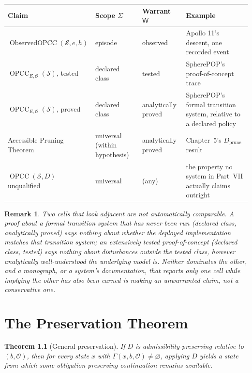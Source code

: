 \documentclass[11pt]{report}
\newtheorem{theorem}[definition]{Theorem}
\newtheorem{remark}[definition]{Remark}
\begin{document}
\begin{table}[h]
\centering
\renewcommand{\arraystretch}{1.3}
\begin{tabular}{p{3.4cm}p{2.6cm}p{2.8cm}p{4.6cm}}
\toprule
Claim & Scope $\Sigma$ & Warrant $\mathsf W$ & Example \\
\midrule
$\operatorname{ObservedOPCC}(\mathcal S, e, h)$ & episode & observed & Apollo 11's descent, one recorded event \\
$\operatorname{OPCC}_{E,\mathcal O}(\mathcal S)$, tested & declared class & tested & SpherePOP's proof-of-concept trace \\
$\operatorname{OPCC}_{E,\mathcal O}(\mathcal S)$, proved & declared class & analytically proved & SpherePOP's formal transition system, relative to a declared policy \\
Accessible Pruning Theorem & universal (within hypothesis) & analytically proved & Chapter~5's $D_{\mathrm{prune}}$ result \\
$\operatorname{OPCC}(\mathcal S, D)$ unqualified & universal & (any) & the property no system in Part~VII actually claims outright \\
\bottomrule
\end{tabular}
\end{table}

\begin{remark}
Two cells that look adjacent are not automatically comparable. A proof about a formal transition system that has never been run (declared class, analytically proved) says nothing about whether the deployed implementation matches that transition system; an extensively tested proof-of-concept (declared class, tested) says nothing about disturbances outside the tested class, however analytically well-understood the underlying model is. Neither dominates the other, and a monograph, or a system's documentation, that reports only one cell while implying the other has also been earned is making an unwarranted claim, not a conservative one.
\end{remark}


\chapter{The Preservation Theorem}

\begin{theorem}[General preservation]
If $D$ is admissibility-preserving relative to $(b, \mathcal O)$, then for every state $x$ with $\Gamma(x, b, \mathcal O) \ne \varnothing$, applying $D$ yields a state from which some obligation-preserving continuation remains available.
\end{theorem}
\end{document}

